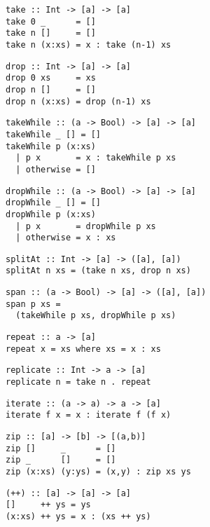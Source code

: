 \begin{multicols}{2}
\begin{verbatim}
take :: Int -> [a] -> [a]
take 0 _      = []
take n []     = []
take n (x:xs) = x : take (n-1) xs
\end{verbatim}

\begin{verbatim}
drop :: Int -> [a] -> [a]
drop 0 xs     = xs 
drop n []     = []
drop n (x:xs) = drop (n-1) xs
\end{verbatim}

\begin{verbatim}
takeWhile :: (a -> Bool) -> [a] -> [a]
takeWhile _ [] = []
takeWhile p (x:xs) 
  | p x       = x : takeWhile p xs
  | otherwise = []
\end{verbatim}

\begin{verbatim}
dropWhile :: (a -> Bool) -> [a] -> [a]
dropWhile _ [] = []
dropWhile p (x:xs) 
  | p x       = dropWhile p xs
  | otherwise = x : xs
\end{verbatim}

\begin{verbatim}  
splitAt :: Int -> [a] -> ([a], [a])
splitAt n xs = (take n xs, drop n xs)
\end{verbatim}

\begin{verbatim}
span :: (a -> Bool) -> [a] -> ([a], [a])
span p xs = 
  (takeWhile p xs, dropWhile p xs)
\end{verbatim}

\begin{verbatim}  
repeat :: a -> [a]
repeat x = xs where xs = x : xs
\end{verbatim}

\begin{verbatim}
replicate :: Int -> a -> [a]
replicate n = take n . repeat
\end{verbatim}

\begin{verbatim}
iterate :: (a -> a) -> a -> [a]
iterate f x = x : iterate f (f x)
\end{verbatim}

\begin{verbatim}
zip :: [a] -> [b] -> [(a,b)]
zip []     _      = []
zip _      []     = []
zip (x:xs) (y:ys) = (x,y) : zip xs ys
\end{verbatim}

\begin{verbatim}
(++) :: [a] -> [a] -> [a]
[]     ++ ys = ys
(x:xs) ++ ys = x : (xs ++ ys)
\end{verbatim}


\end{multicols}
